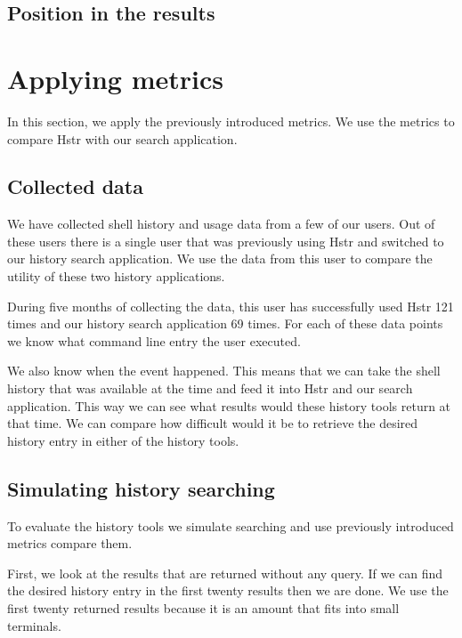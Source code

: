 \subsection{Position in the results}




\section{Applying metrics}

In this section, we apply the previously introduced metrics. We use the metrics to compare Hstr with our search application.

\subsection{Collected data}

We have collected shell history and usage data from a few of our users. Out of these users there is a single user that was previously using Hstr and switched to our history search application. We use the data from this user to compare the utility of these two history applications.

During five months of collecting the data, this user has successfully used Hstr 121 times and our history search application 69 times. For each of these data points we know what command line entry the user executed. 

We also know when the event happened. This means that we can take the shell history that was available at the time and feed it into Hstr and our search application. This way we can see what results would these history tools return at that time. We can compare how difficult would it be to retrieve the desired history entry in either of the history tools. 

\subsection{Simulating history searching}

To evaluate the history tools we simulate searching and use previously introduced metrics compare them.

First, we look at the results that are returned without any query. If we can find the desired history entry in the first twenty results then we are done. We use the first twenty returned results because it is an amount that fits into small terminals. 

